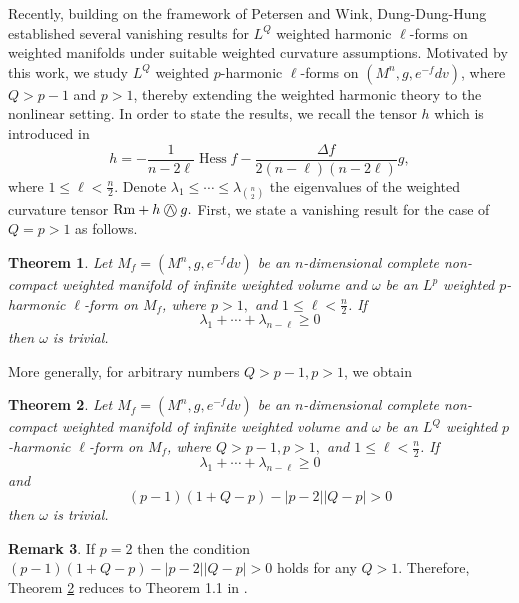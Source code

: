 \documentclass[leqno,12pt]{article} %
\theoremstyle{plain} %
\newtheorem{theorem}{\indent\sc Theorem}[section]
\theoremstyle{definition} %
\newtheorem{remark}[theorem]{\indent\sc Remark}
\numberwithin{equation}{section}
\newcommand{\KN}{\mathbin{\bigcirc\mspace{-15mu}\wedge\mspace{3mu}}}
\begin{document}
Recently, building on the framework of Petersen and Wink, Dung-Dung-Hung \cite{DDH25} established several vanishing results for $L^Q$ weighted  harmonic $\ell$-forms on weighted manifolds under suitable weighted curvature assumptions. Motivated by this work, we study $L^Q$ weighted $p$-harmonic $\ell$-forms on $(M^n,g,e^{-f}dv)$, where $Q>p-1$ and $p>1$, thereby extending the weighted harmonic theory to the nonlinear setting. 
In order to state the results, we recall the tensor $h$ which is introduced in \cite{DDH25} 
	$$
h=-\frac{1}{n-2\ell}\operatorname{Hess}f
-\frac{\Delta f}{2(n-\ell)(n-2\ell)}g,
$$ where $1\le \ell < \frac{n}{2}$.
Denote $\lambda_1\le \cdots \le \lambda_{\binom{n}{2}}$ the eigenvalues 
of the weighted curvature tensor
$\mathrm{Rm}+h \KN g.$
 First, we state a vanishing result for the case of $Q=p>1$  as follows.
\begin{theorem}
	Let $M_f=(M^n,g,e^{-f}dv)$ be an $n$-dimensional complete non-compact weighted manifold of infinite weighted volume and $\omega$ be an $L^p$ weighted $p$-harmonic $\ell$-form on $M_f$, where $p>1,$ and $1\le \ell < \frac{n}{2}$. 
	If	$$\lambda_1+\cdots+\lambda_{n-\ell}\ge 0	$$
	then $\omega$ is trivial.
\end{theorem}
 More generally, for arbitrary numbers $Q>p-1,p>1$, we obtain 
\begin{theorem}\label{th1}
	Let $M_f=(M^n,g,e^{-f}dv)$ be an $n$-dimensional complete non-compact weighted manifold of infinite weighted volume and $\omega$ be an $L^Q$ weighted $p$-harmonic $\ell$-form on $M_f$, where $Q>p-1,p>1,$ and $1\le \ell < \frac{n}{2}$. 
	If	$$\lambda_1+\cdots+\lambda_{n-\ell}\ge 0	$$
	and $$(p-1)(1+Q-p)-|p-2||Q-p|>0$$
	then $\omega$ is trivial.
\end{theorem}
\begin{remark}
	If $p=2$ then the condition $(p-1)(1+Q-p)-|p-2||Q-p|>0$ holds for any $Q>1$. Therefore, Theorem \ref{th1} reduces to Theorem 1.1 in \cite{DDH25}.
\end{remark}
\end{document}
